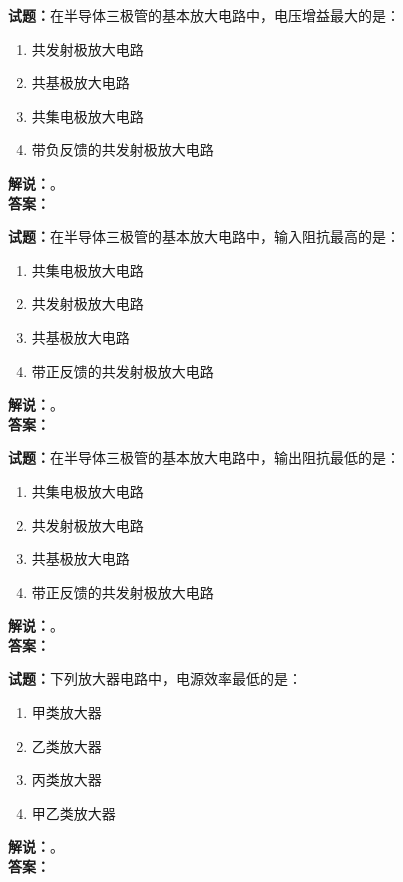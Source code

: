 \documentclass{ctexbook}
\begin{document}
\bigskip

\noindent\textbf{试题：}在半导体三极管的基本放大电路中，电压增益最大的是：
\begin{enumerate}[leftmargin=3em]
  \item 共发射极放大电路
  \item 共基极放大电路
  \item 共集电极放大电路
  \item 带负反馈的共发射极放大电路
\end{enumerate}
\noindent\textbf{解说：}\textbf{}。\\\noindent\textbf{答案：}

\bigskip

\noindent\textbf{试题：}在半导体三极管的基本放大电路中，输入阻抗最高的是：
\begin{enumerate}[leftmargin=3em]
  \item 共集电极放大电路
  \item 共发射极放大电路
  \item 共基极放大电路
  \item 带正反馈的共发射极放大电路
\end{enumerate}
\noindent\textbf{解说：}\textbf{}。\\\noindent\textbf{答案：}

\bigskip

\noindent\textbf{试题：}在半导体三极管的基本放大电路中，输出阻抗最低的是：
\begin{enumerate}[leftmargin=3em]
  \item 共集电极放大电路
  \item 共发射极放大电路
  \item 共基极放大电路
  \item 带正反馈的共发射极放大电路
\end{enumerate}
\noindent\textbf{解说：}\textbf{}。\\\noindent\textbf{答案：}

\bigskip

\noindent\textbf{试题：}下列放大器电路中，电源效率最低的是：
\begin{enumerate}[leftmargin=3em]
  \item 甲类放大器
  \item 乙类放大器
  \item 丙类放大器
  \item 甲乙类放大器
\end{enumerate}
\noindent\textbf{解说：}\textbf{}。\\\noindent\textbf{答案：}
\end{document}

